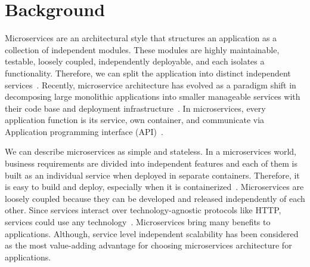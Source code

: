 
\section{Background}\label{sec:background}

\par Microservices are an architectural style that structures an application as a collection of independent modules. These modules are highly maintainable, testable, loosely coupled, independently deployable, and each isolates a functionality. Therefore, we can split the application into distinct independent services~\cite{thones2015}. Recently, microservice architecture has evolved as a paradigm shift in decomposing large monolithic applications into smaller manageable services with their code base and deployment infrastructure~\cite{Taibi2019}. In microservices, every application function is its service, own container, and communicate via Application programming interface (API)~\cite{Danbettinger2019}.

\par We can describe microservices as simple and stateless. In a microservices world, business requirements are divided into independent features and each of them is built as an individual service when deployed in separate containers. Therefore, it is easy to build and deploy, especially when it is containerized~\cite{Pavlovic2020docker, Zaytev2018}. Microservices are loosely coupled because they can be developed and released independently of each other. Since services interact over technology-agnostic protocols like HTTP, services could use any technology~\cite{Jaleel2017}. Microservices bring many benefits to applications. Although, service level independent scalability has been considered as the most value-adding advantage for choosing microservices architecture for applications.

